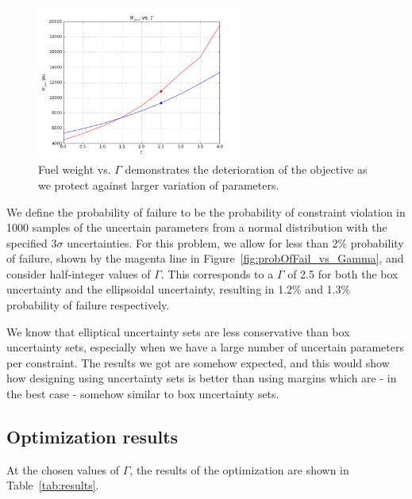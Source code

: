 \documentclass{article}
\begin{document}
{\begin{figure}
\centering
\includegraphics[width=0.6\textwidth]{W_f_vs_Gamma.png}
\caption{Fuel weight vs. $\Gamma$ demonstrates the deterioration of the objective as we protect against larger variation of parameters.}
\label{fig:W_f_vs_Gamma}
\end{figure}

We define the probability of failure to be the probability of constraint violation in 1000 samples of the uncertain parameters from a normal distribution with the specified $3\sigma$ uncertainties. For this problem, we allow for less than 2\% probability of failure, shown by the magenta line in Figure~\ref{fig:probOfFail_vs_Gamma}, and consider half-integer values of $\Gamma$. This corresponds to a $\Gamma$ of 2.5 for both the box uncertainty and the ellipsoidal uncertainty, resulting in 1.2\% and 1.3\% probability of failure respectively.

We know that elliptical uncertainty sets are less conservative than box uncertainty sets, especially when we have a large number of uncertain parameters per constraint. The results we got are somehow expected, and this would show how designing using uncertainty sets is better than using margins which are - in the best case - somehow similar to box uncertainty sets.

\subsection{Optimization results}

At the chosen values of $\Gamma$, the results of the optimization are shown in Table~\ref{tab:results}.

}
\end{document}
